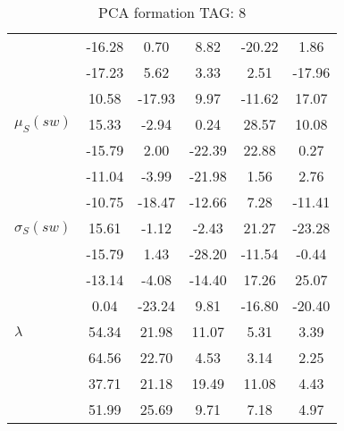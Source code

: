 \begin{table}[h!]
\begin{center}
\begin{tabular}{| l || c | c | c | c | c |}
 & -16.28  & 0.70  & 8.82  & -20.22  & 1.86 \\
 & -17.23  & 5.62  & 3.33  & 2.51  & -17.96 \\
 & 10.58  & -17.93  & 9.97  & -11.62  & 17.07 \\\hline
$\mu_S(sw)$ & 15.33  & -2.94  & 0.24  & 28.57  & 10.08 \\
 & -15.79  & 2.00  & -22.39  & 22.88  & 0.27 \\
 & -11.04  & -3.99  & -21.98  & 1.56  & 2.76 \\
 & -10.75  & -18.47  & -12.66  & 7.28  & -11.41 \\\hline
$\sigma_S(sw)$ & 15.61  & -1.12  & -2.43  & 21.27  & -23.28 \\
 & -15.79  & 1.43  & -28.20  & -11.54  & -0.44 \\
 & -13.14  & -4.08  & -14.40  & 17.26  & 25.07 \\
 & 0.04  & -23.24  & 9.81  & -16.80  & -20.40 \\\hline\hline
$\lambda$ & 54.34  & 21.98  & 11.07  & 5.31  & 3.39 \\
 & 64.56  & 22.70  & 4.53  & 3.14  & 2.25 \\
 & 37.71  & 21.18  & 19.49  & 11.08  & 4.43 \\
 & 51.99  & 25.69  & 9.71  & 7.18  & 4.97 \\\hline
\end{tabular}
\caption{PCA formation TAG: 8}
\end{center}
\end{table}